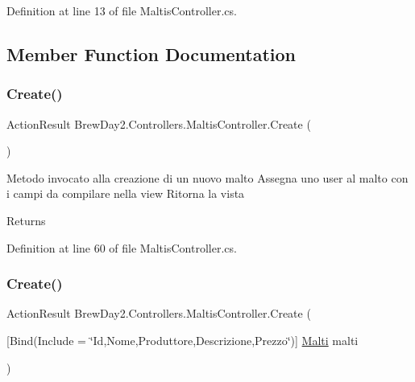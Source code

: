 Definition at line 13 of file Maltis\+Controller.\+cs.



\subsection{Member Function Documentation}
\mbox{\label{class_brew_day2_1_1_controllers_1_1_maltis_controller_ab47f04b509725d05d3ecba882a929213}} 
\subsubsection{\texorpdfstring{Create()}{Create()}\hspace{0.1cm}{\footnotesize\ttfamily [1/2]}}
{\footnotesize\ttfamily Action\+Result Brew\+Day2.\+Controllers.\+Maltis\+Controller.\+Create (\begin{DoxyParamCaption}{ }\end{DoxyParamCaption})}



Metodo invocato alla creazione di un nuovo malto Assegna uno user al malto con i campi da compilare nella view Ritorna la vista 

\begin{DoxyReturn}{Returns}

\end{DoxyReturn}


Definition at line 60 of file Maltis\+Controller.\+cs.

\mbox{\label{class_brew_day2_1_1_controllers_1_1_maltis_controller_adf080c6f3b470d6f97c1756e727309e5}} 
\subsubsection{\texorpdfstring{Create()}{Create()}\hspace{0.1cm}{\footnotesize\ttfamily [2/2]}}
{\footnotesize\ttfamily Action\+Result Brew\+Day2.\+Controllers.\+Maltis\+Controller.\+Create (\begin{DoxyParamCaption}\item[{\mbox{[}\+Bind(\+Include = \char`\"{}\+Id,\+Nome,\+Produttore,\+Descrizione,\+Prezzo\char`\"{})\mbox{]} \mbox{\hyperlink{class_brew_day2_1_1_models_1_1_malti}{Malti}}}]{malti }\end{DoxyParamCaption})}




